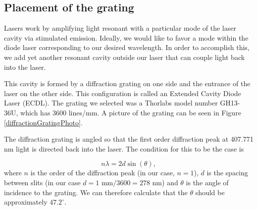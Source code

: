 \subsection{Placement of the grating}



Lasers work by amplifying light resonant with a particular mode of the laser cavity via stimulated emission. Ideally, we would like to favor a mode within the diode laser corresponding to our desired wavelength. In order to accomplish this, we add yet another resonant cavity outside our laser that can couple light back into the laser. 

This cavity is formed by a diffraction grating on one side and the entrance of the laser on the other side. This configuration is called an Extended Cavity Diode Laser (ECDL). The grating we selected was a Thorlabs model number GH13-36U, which has 3600 lines/mm. A picture of the grating can be seen in Figure\,\ref{diffractionGratingPhoto}. 

The diffraction grating is angled so that the first order diffraction peak at 407.771 nm light is directed back into the laser. The condition for this to be the case is 

\begin{equation} \label{gratingEQn}
n \lambda = 2 d \sin (\theta),
\end{equation}
where $n$ is the order of the diffraction peak (in our case, $n=1$), $d$ is the spacing between slits (in our case $d=1$ mm$/3600 = 278 $ nm) and $\theta$ is the angle of incidence to the grating. We can therefore calculate that the $\theta$ should be approximately
\href{http://www.wolframalpha.com/input/?i=arcsin%28+407.771+nm+%2F%282*%281+mm%2F3600%29%29%29+in+degrees}{$47.2^\circ$}.

